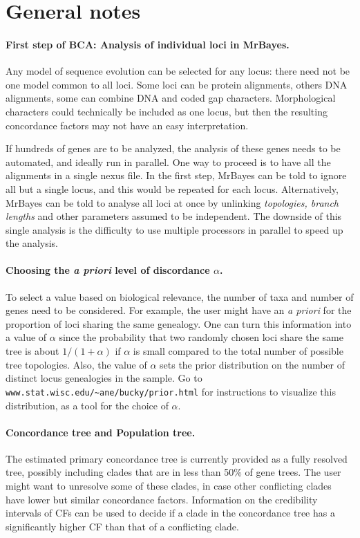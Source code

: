 \documentclass[12pt,english,final,letterpaper]{article}
\begin{document}
\section{General notes}

\paragraph{First step of BCA: Analysis of individual loci in MrBayes.}
Any model of sequence evolution can be selected for any locus: there need 
not be one model common to all loci. Some loci can be protein alignments,
others DNA alignments, some can combine DNA and coded gap characters.
Morphological characters could technically be included as one locus, 
but then the resulting concordance factors may not have an
easy interpretation.

If hundreds of genes are to be analyzed, the analysis of these
genes needs to be automated, and ideally run in parallel. One way 
to proceed is to have all the alignments in a single nexus file. 
In the first step, MrBayes can be told to ignore all but a single 
locus, and this would be repeated for each locus. 
Alternatively, MrBayes can be told to analyse all loci at once 
by unlinking \emph{topologies, branch lengths} and other parameters 
assumed to be independent. The downside of this single analysis 
is the difficulty to use multiple processors in parallel to speed
up the analysis.

\paragraph{Choosing the {\it a priori} level of discordance $\alpha$.}
To select a value based on biological relevance, the number of taxa and 
number of genes need to be considered. For example, the user might have an 
{\it a priori} for the proportion of loci sharing the same genealogy. One 
can turn this information into a value of $\alpha$ since the probability that 
two randomly chosen loci share the same tree is about $1/(1+\alpha)$ if 
$\alpha$ is small compared to the total number of possible tree topologies. 
Also, the value of $\alpha$ sets the prior distribution on the number of 
distinct locus genealogies in the sample. 
Go to \verb+www.stat.wisc.edu/~ane/bucky/prior.html+ for instructions to 
visualize this distribution, as a tool for the choice of $\alpha$. 

\paragraph{Concordance tree and Population tree.}
The estimated primary concordance tree is currently provided as a fully resolved
tree, possibly including clades that are in less than 50\% of gene trees. 
The user might want to unresolve some of these clades, in case other 
conflicting clades have lower but similar concordance factors. Information
on the credibility intervals of {\sc CF}s can be used to decide if a clade
in the concordance tree has a significantly higher {\sc CF} than 
that of a conflicting clade.
\end{document}
